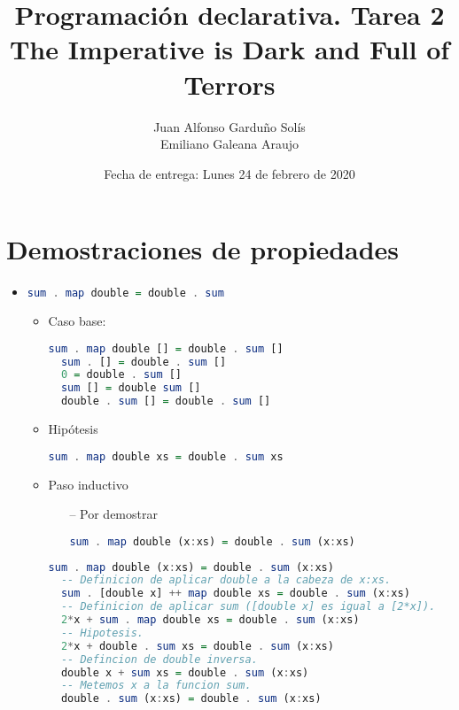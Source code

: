 \documentclass[spanish,12pt,letterpaper]{article}
\title{Programación declarativa. Tarea 2\\
\Huge{The Imperative is Dark and Full of Terrors}}
\author{Juan Alfonso Garduño Solís\\
  Emiliano Galeana Araujo}
\affil{Facultad de ciencias, UNAM}
\date{Fecha de entrega: Lunes 24 de febrero de 2020}
\begin{document}
\maketitle

\section{Demostraciones de propiedades}
\begin{itemize}
\item
  \begin{lstlisting}[language=Haskell]
  sum . map double = double . sum\end{lstlisting}
  \begin{itemize}
    \item Caso base:
    \begin{lstlisting}[language=Haskell]
  sum . map double [] = double . sum []
  sum . [] = double . sum []
  0 = double . sum []
  sum [] = double sum []
  double . sum [] = double . sum []\end{lstlisting}
  \item Hipótesis
    \begin{lstlisting}[language=Haskell]
  sum . map double xs = double . sum xs\end{lstlisting}
  \item Paso inductivo
    \begin{itemize}
    \item [--] Por demostrar
      \begin{lstlisting}[language=Haskell]
  sum . map double (x:xs) = double . sum (x:xs)\end{lstlisting}
    \end{itemize}
    \begin{lstlisting}[language=Haskell]
  sum . map double (x:xs) = double . sum (x:xs)
  -- Definicion de aplicar double a la cabeza de x:xs.
  sum . [double x] ++ map double xs = double . sum (x:xs)
  -- Definicion de aplicar sum ([double x] es igual a [2*x]).
  2*x + sum . map double xs = double . sum (x:xs)
  -- Hipotesis.
  2*x + double . sum xs = double . sum (x:xs)
  -- Defincion de double inversa.
  double x + sum xs = double . sum (x:xs)
  -- Metemos x a la funcion sum.
  double . sum (x:xs) = double . sum (x:xs) \end{lstlisting}
  \end{itemize}


\end{itemize}
\end{document}
